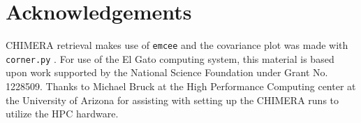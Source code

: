 \documentclass[iop]{emulateapj}
\begin{document}
\vspace{0.1in}
\section*{Acknowledgements}

CHIMERA retrieval makes use of \texttt{emcee} \citep{foreman-mackey2013emcee} and the covariance plot was made with \texttt{corner.py} \citep{foremanCorner}.
For use of the El Gato computing system, this material is based upon work supported by the National Science Foundation under Grant No. 1228509.
Thanks to Michael Bruck at the High Performance Computing center at the University of Arizona for assisting with setting up the CHIMERA runs to utilize the HPC hardware.





\end{document}
